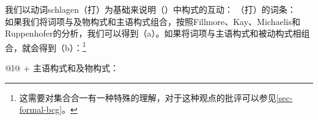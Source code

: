 我们以动词schlagen（打）为基础来说明（）中构式的互动：
\eas
{}（打）的词条：\\
\zs
如果我们将词项与及物构式和主语构式组合，按照Fillmore、Kay、Michaelis和Ruppenhofer的分析，我们可以得到（a）。如果将词项与主语构式和被动构式相组合，就会得到（b）：\footnote{%
	这需要对集合合一有一种特殊的理解，对于这种观点的批评可以参见\ref{sec-formal-bcg}。
}
\eal
\label{ex-schlagen-linking}
\ex 
\label{ex-schlagen-transitive}
\begin{tabular}[t]{@{}l@{}}
 $+$ 主语构式和及物构式：\\
\end{tabular}
